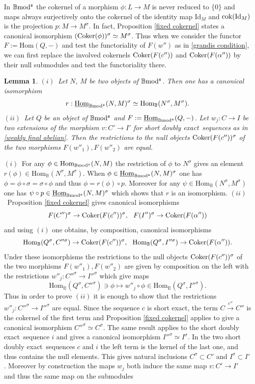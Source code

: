 \documentclass[12pt]{article}
\newtheorem{lem}[thm]{Lemma}
\def\Hom{{\rm Hom}}
\def\Homi{{\underline{\rm Hom}}}
\def\id{{\rm id}}
\def\coker{{\rm Coker}}
\def\scoker{{\rm cok}}
\def\B{{\mathbb B}}
\def\exxx{{doubly exact}~}
\def\id{{\mbox{Id}}}
\def\Hom {{\mbox{Hom}}}
\def\b2{{\rm \B mod^{\mathfrak s}}}
\begin{document}
In $\b2$ the cokernel of a morphism $\phi:L\to M$ is never reduced to $\{0\}$ and maps always surjectively  onto the cokernel of the identity map $\id_M$ and $\scoker(\id_M)$ is the projection $p:M\to M^\sigma$. In fact, Proposition \ref{fixed cokernel} states a canonical isomorphism $(\coker(\phi))^\sigma\simeq M^\sigma$. Thus when we consider the functor $F:=\Hom(Q,-)$ and test the functoriality of $F(w'')$ as in \eqref{grandis condition}, we can first replace the involved cokernels $\coker(F(c''))$ and $\coker(F(\alpha''))$ by their null submodules and test the functoriality there.
\begin{lem}\label{functoriality on fixed}
$(i)$~Let $N$, $M$ be two objects of $\b2$. Then one has a canonical isomorphism 
$$
r:\Homi_\b2(N,M)^\sigma\simeq \Hom_\B(N^\sigma,M^\sigma).
$$
$(ii)$~Let $Q$ be an object of $\b2$ and $F:=\Homi_\b2(Q,-)$.	Let $w_j:C\to I$ be two extensions  of the morphism $v:C'\to I'$ for short \exxx sequences as in \eqref{weakly final abelian}. Then the restrictions to the null objects $\coker(F(c''))^\sigma$ of the two morphisms $F(w''_1), F(w''_2)$ are equal.
\end{lem}
\proof $(i)$~For any $\phi \in \Hom_\b2(N,M)$ the restriction of $\phi$ to $N^\sigma$ gives an element  $r(\phi)\in \Hom_\B(N^\sigma,M^\sigma)$. When $\phi\in \Homi_\b2(N,M)^\sigma$ one has $\phi=\phi\circ \sigma=\sigma\circ \phi$ and thus $\phi=r(\phi)\circ p$.
Moreover for any $\psi\in \Hom_\B(N^\sigma,M^\sigma)$ one has $\psi\circ p\in \Homi_\b2(N,M)^\sigma$ which shows that $r$ is an isomorphism.\newline
$(ii)$~Proposition \ref{fixed cokernel} gives canonical isomorphisms 
$$
F(C'')^\sigma\to\coker(F(c''))^\sigma, \ \ F(I'')^\sigma\to\coker(F(\alpha''))
$$
and using $(i)$ one obtains, by composition, canonical isomorphisms 
$$
\Hom_\B(Q^\sigma,C''^\sigma)\to\coker(F(c''))^\sigma, \ \ \Hom_\B(Q^\sigma,I''^\sigma)\to\coker(F(\alpha'')).
$$
Under these isomorphisms the restrictions to the null objects $\coker(F(c''))^\sigma$ of the two morphisms $F(w''_1), F(w''_2)$ are given by composition on the left with the restrictions $w''_j:C''^\sigma\to I''^\sigma$ which give maps 
$$
 \Hom_\B(Q^\sigma,C''^\sigma)\ni \phi\mapsto w''_j\circ \phi \in \Hom_\B(Q^\sigma,I''^\sigma).
$$
Thus in order to prove $(ii)$ it is enough to show that  the restrictions $w''_j:C''^\sigma\to I''^\sigma$ are equal. Since the sequence $c$ is short exact, the  term $C\stackrel{c''}{\to} C''$ is the cokernel of the first term and Proposition \ref{fixed cokernel} applies to give a canonical isomorphism $C''^\sigma\simeq C^\sigma$. The same result applies to the short \exxx sequence $i$ and gives a canonical isomorphism $I''^\sigma\simeq I^\sigma$. In the two short \exxx sequences $c$ and $i$ the left term is the kernel of the last one, and thus contains the null elements. This gives natural inclusions $C^\sigma\subset C'$ and $I^\sigma\subset I'$. Moreover by construction the maps $w_j$ both induce the same map $v:C'\to I'$ and thus the same map on the submodules 
\end{document}
